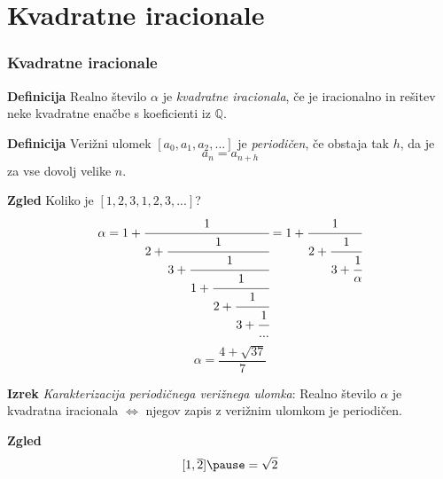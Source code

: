 \documentclass{beamer}
\newcommand{\Q}{\mathbb{Q}}
\newenvironment{df}{\begin{block}{\textbf{Definicija}}}{\end{block}}
\newenvironment{iz}{\begin{block}{\textbf{Izrek}}}{\end{block}}
\newenvironment{zg}{\begin{block}{\textbf{Zgled}}}{\end{block}}
\begin{document}
\section{Kvadratne iracionale}

\begin{frame}
\frametitle{Kvadratne iracionale}
	\begin{df}
	Realno število $\alpha$ je \textit{kvadratne iracionala}, če je iracionalno in rešitev neke kvadratne enačbe s koeficienti iz $\Q$.
	\end{df}  \pause
	\begin{df}
	Verižni ulomek $[a_0, a_1, a_2, ...]$ je \textit{periodičen}, če obstaja tak $h$, da je $$a_n=a_{n+h}$$ za vse dovolj velike $n$.
	\end{df}
\end{frame}

\begin{frame}
	\begin{zg}
	Koliko je $[1, 2, 3, 1, 2, 3, ...]$? $$\alpha = 1+\cfrac{1}{2+\cfrac{1}{3+\cfrac{1}{1+\cfrac{1}{2+\cfrac{1}{3+\cfrac{1}{...}}}}}}=1+\cfrac{1}{2+\cfrac{1}{3+\cfrac{1}{\alpha}}}$$
	$$\alpha = \frac{4+\sqrt{37}}{7}$$
	\end{zg}
\end{frame}

\begin{frame}
	\begin{iz}
	\textit{Karakterizacija periodičnega verižnega ulomka}: Realno število $\alpha$ je kvadratna iracionala $\Leftrightarrow$ njegov zapis z verižnim ulomkom je periodičen.
	\end{iz}
	\begin{zg}
	$$[1,\overline{2}] \pause = \sqrt{2}$$
	\end{zg}
\end{frame}
\end{document}
